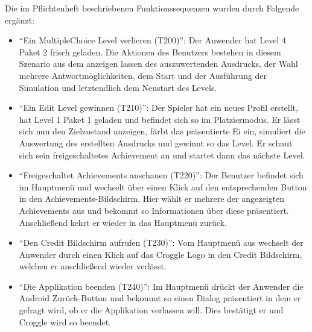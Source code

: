 Die im Pflichtenheft beschriebenen Funktionssequenzen wurden durch Folgende ergänzt:

\begin{itemize}
   \item "`Ein MultipleChoice Level verlieren (T200)"': Der Anwender hat Level 4 Paket 2 frisch geladen. Die Aktionen des Benutzers bestehen in diesem Szenario aus dem anzeigen lassen des auszuwertenden Ausdrucks, der Wahl mehrere Antwortmöglichkeiten, dem Start und der Ausführung der Simulation und letztendlich dem Neustart des Levels.
  
      \item "`Ein Edit Level gewinnen (T210)"': Der Spieler hat ein neues Profil erstellt, hat Level 1 Paket 1 geladen und befindet sich so im Platziermodus. Er lässt sich nun den Zielzustand anzeigen, färbt das präsentierte Ei ein, simuliert die Auswertung des erstellten Ausdrucks und gewinnt so das Level. Er schaut sich sein freigeschaltetes Achievement an und startet dann das nächste Level.
  
   \item "`Freigeschaltet Achievements anschauen (T220)"': Der Benutzer befindet sich im Hauptmenü und wechselt über einen Klick auf den entsprechenden Button in den Achievements-Bildschirm. Hier wählt er mehrere der angezeigten Achievements aus und bekommt so Informationen über diese präsentiert. Anschließend kehrt er wieder in das Hauptmenü zurück.
  
   \item "`Den Credit Bildschirm aufrufen (T230)"': Vom Hauptmenü aus wechselt der Anwender durch einen Klick auf das Croggle Logo in den Credit Bildschirm, welchen er anschließend wieder verlässt.
   
   \item "`Die Applikation beenden (T240)"': Im Hauptmenü drückt der Anwender die Android Zurück-Button und bekommt so einen Dialog präsentiert in dem er gefragt wird, ob er die Applikation verlassen will. Dies bestätigt er und Croggle wird so beendet.
   \end{itemize}
   

   
   